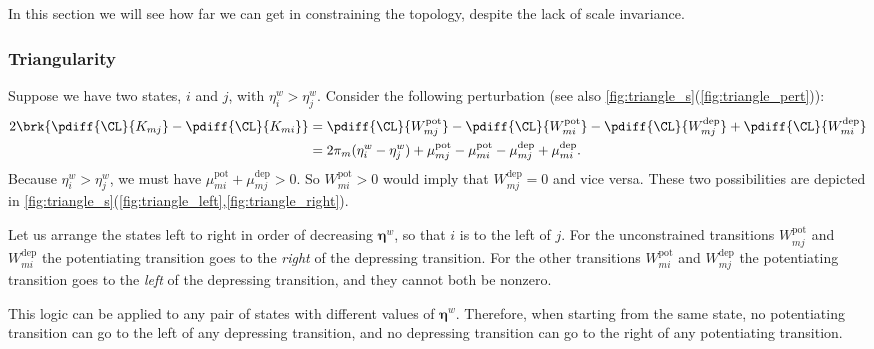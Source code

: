 \documentclass[12pt]{article}
\newcommand{\eqm}{\pi}
\newcommand{\etwm}{\eta^w}
\newcommand{\etw}{\boldsymbol{\eta}^w}
\newcommand{\Wm}{W}
\newcommand{\encm}{K}
\newcommand{\pot}{^{\text{pot}}}
\newcommand{\dep}{^{\text{dep}}}
\begin{document}
In this section we will see how far we can get in constraining the topology, 
despite the lack of scale invariance.



\subsubsection{Triangularity}\label{sec:parttriangular}

Suppose we have two states, \(i\) and \(j\), with \( \etwm_i > \etwm_j \).
Consider the following perturbation (see also \cref{fig:triangle_s}(\ref{fig:triangle_pert})):
%
\begin{equation}\label{eq:pertKupdn}
\begin{aligned}
  2 \brk{\pdiff{\CL}{\encm_{mj}} - \pdiff{\CL}{\encm_{mi}}}
  &= \pdiff{\CL}{\Wm\pot_{mj}} - \pdiff{\CL}{\Wm\pot_{mi}} -
  \pdiff{\CL}{\Wm\dep_{mj}} + \pdiff{\CL}{\Wm\dep_{mi}} \\ 
    &= 2 \eqm_m (\etwm_i - \etwm_j) 
    + \mu\pot_{mj} - \mu\pot_{mi} - \mu\dep_{mj} + \mu\dep_{mi}.
\end{aligned}
\end{equation}
%
Because \( \etwm_i > \etwm_j \), we must have \( \mu\pot_{mi} + \mu\dep_{mj} > 0 \).
So \( \Wm\pot_{mi} > 0 \) would imply that \( \Wm\dep_{mj} = 0 \) and vice versa.
These two possibilities are depicted in \cref{fig:triangle_s}(\ref{fig:triangle_left},\ref{fig:triangle_right}).

Let us arrange the states left to right in order of decreasing \(\etw\), so that \(i\) is to the left of \(j\).
For the unconstrained transitions \( \Wm\pot_{mj} \) and \( \Wm\dep_{mi} \) the potentiating transition goes to the \emph{right} of the depressing transition.
For the other transitions \( \Wm\pot_{mi} \) and \( \Wm\dep_{mj} \) the potentiating transition goes to the \emph{left} of the depressing transition, and they cannot both be nonzero.

This logic can be applied to any pair of states with different values of \(\etw\).
Therefore, when starting from the same state, no potentiating transition can go to the left of any depressing transition, and no depressing transition can go to the right of any potentiating transition.
\end{document}
